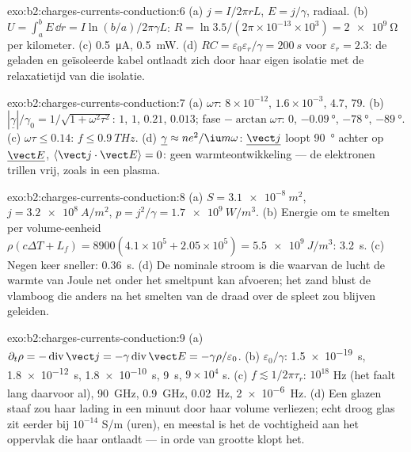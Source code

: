 \begin{solution}{exo:b2:charges-currents-conduction:6}
(a) $j = I/2\pi rL$, $E = j/\gamma$, radiaal. (b)
$U = \int_a^bE\,\dd r = I\ln(b/a)/
2\pi\gamma L$:
$R = \ln3.5/(2\pi \times 10^{-13} \times 10^3) = \qty{2e9}{\ohm}$ per
kilometer. (c) \qty{0.5}{\micro A}, \qty{0.5}{mW}. (d)
$RC = \varepsilon_0\varepsilon_r/\gamma = \qty{200}{s}$ voor
$\varepsilon_r = 2.3$: de geladen en geïsoleerde kabel ontlaadt zich door
haar eigen isolatie met de relaxatietijd van die isolatie.
\end{solution}

\begin{solution}{exo:b2:charges-currents-conduction:7}
(a) $\omega\tau$: $8 \times 10^{-12}$, $1.6 \times 10^{-3}$, $4.7$, $79$.
(b) $|\underline\gamma|/\gamma_0 =
1/\sqrt{1 + \omega^2\tau^2}$: $1$, $1$,
$0.21$, $0.013$; fase $-\arctan\omega\tau$: $0$, $-\qty{0.09}{\degree}$,
$-\qty{78}{\degree}$, $-\qty{89}{\degree}$. (c) $\omega\tau \le 0.14$:
$f \le
\qty{0.9}{THz}$. (d) $\underline\gamma \approx ne^2/\iu m\omega$:
$\underline{\vect j}$ loopt \qty{90}{\degree} achter op
$\underline{\vect E}$, $\langle\vect j\cdot\vect E\rangle = 0$: geen
warmteontwikkeling --- de elektronen trillen vrij, zoals in een plasma.
\end{solution}

\begin{solution}{exo:b2:charges-currents-conduction:8}
(a) $S = \qty{3.1e-8}{m^2}$, $j = \qty{3.2e8}{A/m^2}$,
$p = j^2/\gamma = \qty{1.7e9}{W/m^3}$. (b) Energie om te smelten per
volume-eenheid
$\rho(c\Delta T + L_f) = 8900(4.1 \times 10^5 + 2.05 \times
10^5) = \qty{5.5e9}{J/m^3}$:
\qty{3.2}{s}. (c) Negen keer sneller: \qty{0.36}{s}. (d) De nominale stroom
is die waarvan de lucht de warmte van Joule net onder het smeltpunt kan
afvoeren; het zand blust de vlamboog die anders na het smelten van de draad
over de spleet zou blijven geleiden.
\end{solution}

\begin{solution}{exo:b2:charges-currents-conduction:9}
(a)
$\partial_t\rho = -\operatorname{div}\vect j = -\gamma\operatorname{div}\vect E = -\gamma\rho/
\varepsilon_0$.
(b) $\varepsilon_0/\gamma$: \qty{1.5e-19}{s}, \qty{1.8e-12}{s},
\qty{1.8e-10}{s}, \qty{9}{s}, $9 \times 10^4$ s. (c)
$f \lesssim 1/2\pi\tau_r$: $10^{18}$ Hz (het  faalt lang
daarvoor al), \qty{90}{GHz}, \qty{0.9}{GHz}, \qty{0.02}{Hz}, \qty{2e-6}{Hz}.
(d) Een glazen staaf zou haar lading in een minuut door haar volume
verliezen; echt droog glas zit eerder bij $10^{-14}$ S/m (uren), en meestal
is het de vochtigheid aan het oppervlak die haar ontlaadt --- in orde van
grootte klopt het.
\end{solution}

